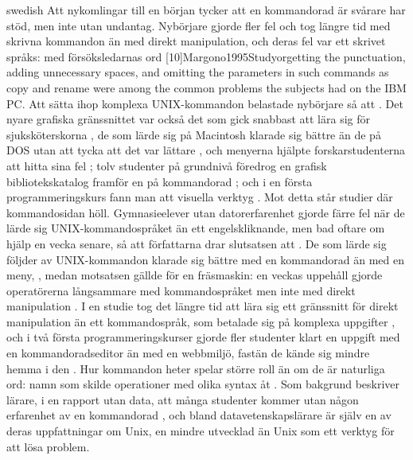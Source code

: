 \begin{onlyin}{swedish}
Att nykomlingar till en början tycker att en kommandorad är svårare har
stöd, men inte utan undantag.  Nybörjare gjorde fler fel och tog längre
tid med skrivna kommandon än med direkt manipulation, och deras fel var
ett skrivet språks: med försöksledarnas ord
[10]{Margono1995Study}{orgetting the
punctuation, adding unnecessary spaces, and omitting the parameters in
such commands as copy and rename were among the common problems the
subjects had on the IBM PC}.  Att sätta ihop komplexa UNIX-kommandon
belastade nybörjare så att
.
Det nyare grafiska gränssnittet var också det som gick snabbast att lära
sig för sjuksköterskorna \autocite{Staggers2000Comparing}, de som lärde
sig på Macintosh klarade sig bättre än de på DOS utan att tycka att det
var lättare \autocite{Davis1993Training}, och menyerna hjälpte
forskarstudenterna att hitta sina fel \autocite{Schultz1998Effects};
tolv studenter på grundnivå föredrog en grafisk bibliotekskatalog framför en på
kommandorad \autocite{Meadows2011Graphical}; och i en första
programmeringskurs fann man att visuella verktyg
.  Mot detta står
studier där kommandosidan höll.  Gymnasieelever utan datorerfarenhet
gjorde färre fel när de lärde sig UNIX-kommandospråket än ett
engelskliknande, men bad oftare om hjälp en vecka senare, så att
författarna drar slutsatsen att
.  De som lärde sig följder av
UNIX-kommandon klarade sig bättre med en kommandorad än med en meny,
, medan motsatsen gällde för en fräsmaskin: en veckas
uppehåll gjorde operatörerna långsammare med kommandospråket men inte
med direkt manipulation \autocite{TorresChazaro1992Comparison}.  I en
studie tog det längre tid att lära sig ett gränssnitt för direkt
manipulation än ett kommandospråk, som betalade sig på komplexa uppgifter
\autocite{Reinhard1991Effect}, och i två första programmeringskurser
gjorde fler studenter klart en uppgift med en kommandoradseditor än med
en webbmiljö, fastän de kände sig mindre hemma i den
\autocite{Cooper2020Exploring}.  Hur kommandon heter spelar större roll
än om de är naturliga ord: namn som skilde operationer med olika syntax
åt .  Som bakgrund beskriver lärare, i en rapport utan data, att
många studenter kommer utan någon erfarenhet av en kommandorad
\autocite{Kendon2016Unix}, och bland
datavetenskapslärare är
 själv en av deras uppfattningar om Unix, en
mindre utvecklad än Unix som ett verktyg för att lösa problem.


\end{onlyin}
